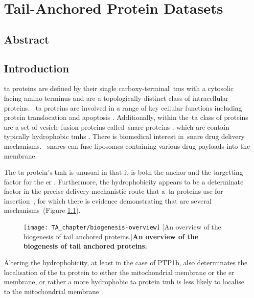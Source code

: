 \chapter{Tail-Anchored Protein Datasets}
\sloppy

\section{Abstract}

\section{Introduction}

\gls{ta} proteins are defined by their single carboxy-terminal~\gls{tms} with a cytosolic facing amino-terminus and are a topologically distinct class of intracellular proteins.
~\gls{ta} proteins are involved in a range of key cellular functions including protein translocation \cite{Osborne2005} and apoptosis \cite{Hockenbery1990}.
Additionally, within the~\gls{ta} class of proteins are a set of vesicle fusion proteins called~\gls{snare} proteins \cite{Ungar2003}, which are contain typically hydrophobic \gls{tmh}s \cite{Kalbfleisch2007}.
There is biomedical interest in~\gls{snare} drug delivery mechanisms.
~\gls{snare}s can fuse liposomes containing various drug payloads into the membrane. %

The \gls{ta} protein's \gls{tmh} is unusual in that it is both the anchor and the targetting factor for the \gls{er} \cite{Kutay1993}.
Furthermore, the hydrophobicity appears to be a determinate factor in the precise delivery mechanistic route that a~\gls{ta} proteins use for insertion~\cite{Rabu2008, Rabu2009}, for which there is evidence demonstrating that are several mechanisms~\cite{Rabu2009, Johnson2013}(Figure \ref{fig:biogenesis-overview}).


\begin{figure}[!ht]
\centering
\texttt{[image: TA\_chapter/biogenesis-overview]}
		[An overview of the biogenesis of tail anchored proteins.]{\textbf{An overview of the biogenesis of tail anchored proteins.}
}

\label{fig:biogenesis-overview}
\end{figure}


Altering the hydrophobicity, at least in the case of PTP1b, also determinates the localisation of the \gls{ta} protein to either the mitochondrial membrane or the \gls{er} membrane, or rather a more hydrophobic \gls{ta} protein \gls{tmh} is less likely to localise to the mitochondrial membrane \cite{Fueller2015}.

